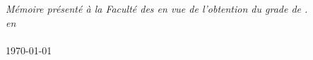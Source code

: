 \begin{titlepage}
\begin{center}

\vfill



\textit{Mémoire présenté à la Faculté des \myFaculty en vue de l'obtention du grade de \myDegree.}\\[0.2cm] %
\textit{en}\\[0.2cm]
\myDepartment \\[0.75cm]

{\large \today}\\




\end{center}

\end{titlepage}